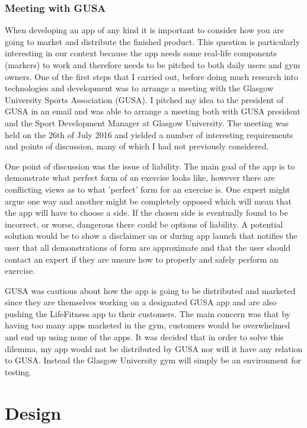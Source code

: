 \documentclass{l4proj}
\begin{document}
\subsection{Meeting with GUSA}
When developing an app of any kind it is important to consider how you are going to market and distribute the finished product. This question is particularly interesting in our context because the app needs some real-life components (markers) to work and therefore needs to be pitched to both daily users and gym owners. One of the first steps that I carried out, before doing much research into technologies and development was to arrange a meeting with the Glasgow University Sports Association (GUSA). I pitched my idea to the president of GUSA in an email and was able to arrange a meeting both with GUSA president and the Sport Development Manager at Glasgow University. The meeting 	was held on the 26th of July 2016 and yielded a number of interesting requirements and points of discussion, many of which I had not previously considered. 

One point of discussion was the issue of liability. The main goal of the app is to demonstrate what perfect form of an exercise looks like, however there are conflicting views as to what 'perfect' form for an exercise is. One expert might argue one way and another might be completely opposed which will mean that the app will have to choose a side. If the chosen side is eventually found to be incorrect, or worse, dangerous there could be options of liability. A potential solution would be to show a disclaimer on or during app launch that notifies the user that all demonstrations of form are approximate and that the user should contact an expert if they are unsure how to properly and safely perform an exercise. 

GUSA was cautious about how the app is going to be distributed and marketed since they are themselves working on a designated GUSA app and are also pushing the LifeFitness app to their customers. The main concern was that by having too many apps marketed in the gym, customers would be overwhelmed and end up using none of the apps. It was decided that in order to solve this dilemma, my app would not be distributed by GUSA nor will it have any relation to GUSA. Instead the Glasgow University gym will simply be an environment for testing. 


\chapter{Design}
\end{document}
